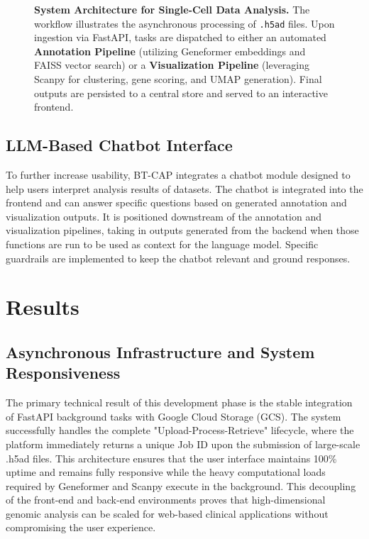 \documentclass[conference]{IEEEtran}
\begin{document}
\begin{figure}[htbp]
    
    \caption{\textbf{System Architecture for Single-Cell Data Analysis.} The workflow illustrates the asynchronous processing of \texttt{.h5ad} files. Upon ingestion via FastAPI, tasks are dispatched to either an automated \textbf{Annotation Pipeline} (utilizing Geneformer embeddings and FAISS vector search) or a \textbf{Visualization Pipeline} (leveraging Scanpy for clustering, gene scoring, and UMAP generation). Final outputs are persisted to a central store and served to an interactive frontend.}
    \label{fig:analysis_pipeline}
\end{figure}

\subsection{LLM-Based Chatbot Interface}
To further increase usability, BT-CAP integrates a chatbot module designed to help users interpret analysis results of datasets. The chatbot is integrated into the frontend and can answer specific questions based on generated annotation and visualization outputs. It is positioned downstream of the annotation and visualization pipelines, taking in outputs generated from the backend when those functions are run to be used as context for the language model. Specific guardrails are implemented to keep the chatbot relevant and ground responses.

\section{Results}

\subsection{Asynchronous Infrastructure and System Responsiveness}
The primary technical result of this development phase is the stable integration of FastAPI background tasks with Google Cloud Storage (GCS). The system successfully handles the complete "Upload-Process-Retrieve" lifecycle, where the platform immediately returns a unique Job ID upon the submission of large-scale .h5ad files. This architecture ensures that the user interface maintains 100\% uptime and remains fully responsive while the heavy computational loads required by Geneformer and Scanpy execute in the background. This decoupling of the front-end and back-end environments proves that high-dimensional genomic analysis can be scaled for web-based clinical applications without compromising the user experience.
\end{document}
